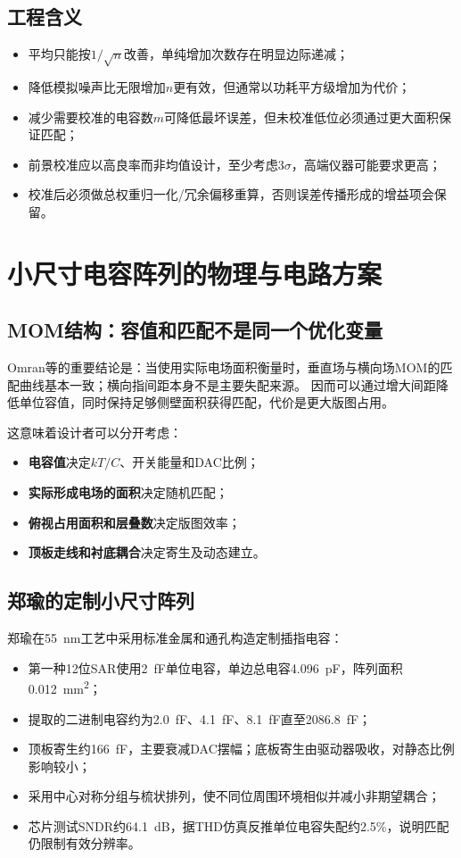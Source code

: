 \documentclass[UTF8,a4paper,11pt]{ctexart}
\begin{document}
\subsection{工程含义}

\begin{itemize}
  \item 平均只能按$1/\sqrt n$改善，单纯增加次数存在明显边际递减；
  \item 降低模拟噪声比无限增加$n$更有效，但通常以功耗平方级增加为代价；
  \item 减少需要校准的电容数$m$可降低最坏误差，但未校准低位必须通过更大面积保证匹配；
  \item 前景校准应以高良率而非均值设计，至少考虑$3\sigma$，高端仪器可能要求更高；
  \item 校准后必须做总权重归一化/冗余偏移重算，否则误差传播形成的增益项会保留。
\end{itemize}

\section{小尺寸电容阵列的物理与电路方案}

\subsection{MOM结构：容值和匹配不是同一个优化变量}

Omran等的重要结论是：当使用实际电场面积衡量时，垂直场与横向场MOM的匹配曲线基本一致；横向指间距本身不是主要失配来源。\cite{omran2016} 因而可以通过增大间距降低单位容值，同时保持足够侧壁面积获得匹配，代价是更大版图占用。

这意味着设计者可以分开考虑：
\begin{itemize}
  \item \textbf{电容值}决定$kT/C$、开关能量和DAC比例；
  \item \textbf{实际形成电场的面积}决定随机匹配；
  \item \textbf{俯视占用面积和层叠数}决定版图效率；
  \item \textbf{顶板走线和衬底耦合}决定寄生及动态建立。
\end{itemize}

\subsection{郑瑜的定制小尺寸阵列}

郑瑜在\SI{55}{nm}工艺中采用标准金属和通孔构造定制插指电容：\cite{zheng2024}
\begin{itemize}
  \item 第一种12位SAR使用\SI{2}{fF}单位电容，单边总电容\SI{4.096}{pF}，阵列面积\SI{0.012}{mm^2}；
  \item 提取的二进制电容约为\SI{2.0}{fF}、\SI{4.1}{fF}、\SI{8.1}{fF}直至\SI{2086.8}{fF}；
  \item 顶板寄生约\SI{166}{fF}，主要衰减DAC摆幅；底板寄生由驱动器吸收，对静态比例影响较小；
  \item 采用中心对称分组与梳状排列，使不同位周围环境相似并减小非期望耦合；
  \item 芯片测试SNDR约\SI{64.1}{dB}，据THD仿真反推单位电容失配约2.5\%，说明匹配仍限制有效分辨率。
\end{itemize}
\end{document}
